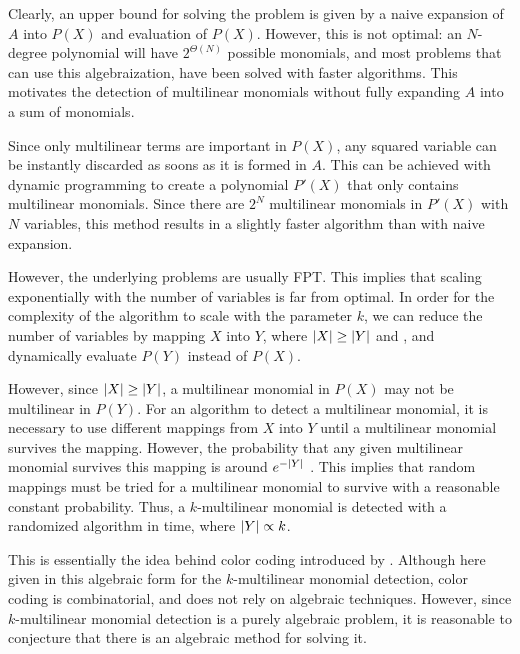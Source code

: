 Clearly, an upper bound for solving the problem is given by a 
naive expansion of $A$ into $P(X)$ and evaluation of $P(X)$. 
However, this is not optimal: an $N$-degree polynomial will have $2^{\Theta(N)}$ 
possible monomials, and most problems that can use this algebraization, 
have been solved with faster algorithms. %
This motivates the detection of multilinear monomials 
without fully expanding $A$ into a sum of monomials.

Since only multilinear terms are important in $P(X)$, 
any squared variable can be instantly discarded as soons as it is formed in $A$. 
This can be achieved with dynamic programming to create a polynomial $P'(X)$ that 
only contains multilinear monomials. Since there are $2^N$ multilinear monomials in $P'(X)$ with 
$N$ variables, this method results in a slightly 
faster algorithm than with naive expansion.

However, the underlying problems are usually FPT. This implies that scaling exponentially 
with the number of variables is far from optimal. In order for the complexity of the algorithm to scale 
with the parameter $k$, we can reduce the number of variables by mapping $X$ into $Y$, where 
${\left\vert X\right\vert} \geq {\left\vert Y\right\vert}$ and
, and dynamically evaluate $P(Y)$ instead of
$P(X)$. 

However, since ${\left\vert X\right\vert} \geq {\left\vert Y\right\vert}$, a multilinear monomial in $P(X)$ may not be multilinear in $P(Y)$. 
For an algorithm to detect a multilinear monomial, it is necessary to use different mappings 
from $X$ into $Y$ until a multilinear monomial survives the mapping. However, the probability 
that any given multilinear monomial survives this mapping is around $e^{-{\left\vert Y\right\vert}}$ \cite{KouWil15}. 
This implies that 
 random mappings must be tried for a 
multilinear monomial to survive with a reasonable constant probability. Thus, a 
$k$-multilinear monomial is detected with a 
randomized algorithm in  time, where ${\left\vert Y\right\vert} \propto k$.

This is essentially the idea behind color coding introduced by \citeauthor{Alon95} \cite{Alon95}. 
Although here given in this algebraic form for the $k$-multilinear monomial detection, 
color coding is combinatorial, and does not rely on algebraic techniques. 
However, since $k$-multilinear monomial detection is a purely algebraic problem, it is reasonable to 
conjecture that there is an algebraic method for solving it.

